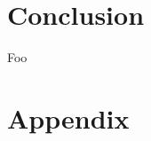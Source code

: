 \documentclass[a4paper,11pt]{article}
\begin{document}


\section{Conclusion}

\newpage

\begin{thebibliography}{}

Foo
\end{thebibliography}

\section*{Appendix}
%
\end{document}
